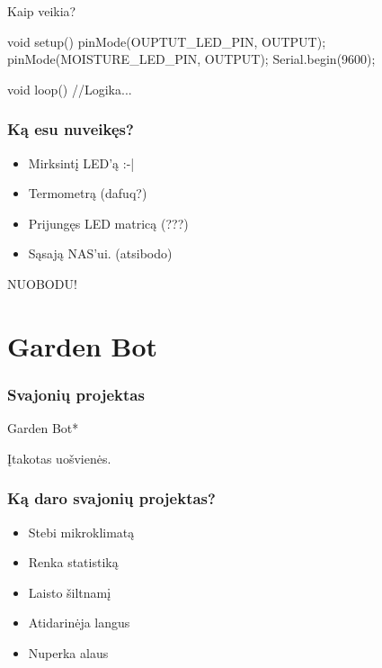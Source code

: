 \documentclass[12pt,a4paper]{beamer}
\begin{document}
\begin{frame}[fragile]{Kaip veikia?}
\begin{ccode}
    void setup() {                
        pinMode(OUPTUT_LED_PIN, OUTPUT);
        pinMode(MOISTURE_LED_PIN, OUTPUT);
        Serial.begin(9600);
    }

    void loop() {
        //Logika...
    }
\end{ccode}
\end{frame}

\begin{frame}
    \frametitle{Ką esu nuveikęs?}

    \pause
    \begin{itemize}
        \item Mirksintį LED'ą :-|
        \pause
        \item Termometrą (dafuq?)
        \pause
        \item Prijungęs LED matricą (???)
        \pause
        \item Sąsają NAS'ui. (atsibodo)
    \end{itemize}
    \pause
    \begin{center}
        NUOBODU!
    \end{center}
\end{frame}

\section{Garden Bot}
\begin{frame}
    \frametitle{Svajonių projektas}

    \begin{center}
        {\Huge Garden Bot*}
    \end{center}

    \vskip1cm
    {\small *Įtakotas uošvienės.}
    
\end{frame}

\begin{frame}
    \frametitle{Ką daro svajonių projektas?}

    \begin{itemize}
        \item Stebi mikroklimatą
        \item Renka statistiką
        \item Laisto šiltnamį
        \item Atidarinėja langus
        \item Nuperka alaus
    \end{itemize}
\end{frame}
\end{document}
